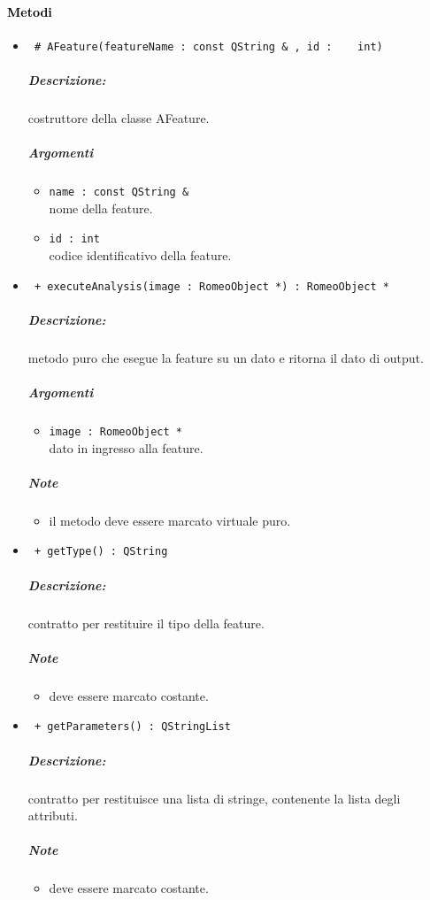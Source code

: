 \paragraph{\textcolor{black}{Metodi\\}}
	\begin{itemize}
	\item \color{blue}\verb! # AFeature(featureName : const QString & , id :	int)!
		\color{black}
		\subparagraph{Descrizione:} costruttore della classe AFeature.
		\subparagraph{Argomenti}
			\begin{itemize}
				\item \color{RoyalPurple} \verb!name : const QString &! \\ 
				\color{black} nome della feature\g{}.	
				\item \color{RoyalPurple} \verb!id : int! \\ 
				\color{black} codice identificativo della feature\g{}.	
			\end{itemize}
			
	\item \color{blue}\verb! + executeAnalysis(image : RomeoObject *) : RomeoObject *!
		\color{black}
		\subparagraph{Descrizione:} metodo puro che esegue la feature su un dato e ritorna il dato di output.
		\subparagraph{Argomenti}
			\begin{itemize}
				\item \color{RoyalPurple} \verb!image : RomeoObject * ! \\ 
				\color{black} dato in ingresso alla feature.		
			\end{itemize}
		\subparagraph{Note}
			\begin{itemize}
				\item il metodo deve essere marcato virtuale puro.
			\end{itemize}
			
	\item \color{blue}\verb! + getType() : QString !
		\color{black}
		\subparagraph{Descrizione:}  contratto per restituire il tipo della feature\g{}.
		\subparagraph{Note}
			\begin{itemize}
				\item deve essere marcato costante.
			\end{itemize}
			
	\item \color{blue}\verb! + getParameters() : QStringList!
		\color{black}
		\subparagraph{Descrizione:}  contratto per restituisce una lista di stringe, contenente la lista degli 						attributi.
		\subparagraph{Note}
			\begin{itemize}
				\item deve essere marcato costante.
			\end{itemize}
	

\end{itemize}
